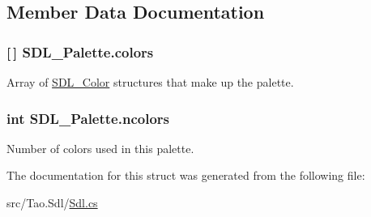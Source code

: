 \subsection{Member Data Documentation}
\hypertarget{struct_s_d_l___palette_a3c2b56423f3b4721342f1d3c578c74f8}{
\subsubsection[{colors}]{ \mbox{[}$\,$\mbox{]} {\bf SDL\_\-Palette.colors}}}
\label{struct_s_d_l___palette_a3c2b56423f3b4721342f1d3c578c74f8}


Array of \hyperlink{struct_s_d_l___color}{SDL\_\-Color} structures that make up the palette. 

\hypertarget{struct_s_d_l___palette_ac5e1433dc0331e63010048d63d2be8e2}{
\subsubsection[{ncolors}]{\setlength{\rightskip}{0pt plus 5cm}int {\bf SDL\_\-Palette.ncolors}}}
\label{struct_s_d_l___palette_ac5e1433dc0331e63010048d63d2be8e2}


Number of colors used in this palette. 



The documentation for this struct was generated from the following file:\begin{DoxyCompactItemize}
\item 
src/Tao.Sdl/\hyperlink{_sdl_8cs}{Sdl.cs}\end{DoxyCompactItemize}
